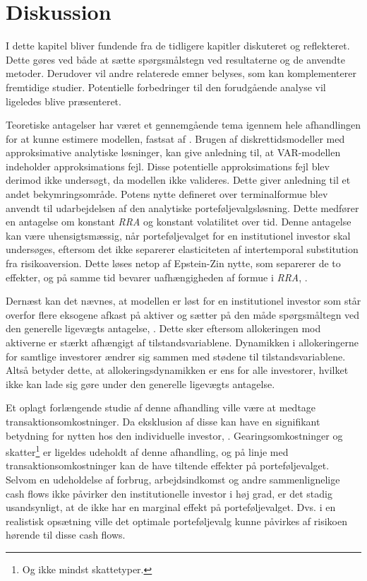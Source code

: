 \documentclass[
  a4paper,
  oneside]{memoir}
\begin{document}
\hypertarget{disku}{%
\chapter{Diskussion}\label{disku}}

I dette kapitel bliver fundende fra de tidligere kapitler diskuteret og reflekteret. Dette gøres ved både at sætte spørgsmålstegn ved resultaterne og de anvendte metoder. Derudover vil andre relaterede emner belyses, som kan komplementerer fremtidige studier. Potentielle forbedringer til den forudgående analyse vil ligeledes blive præsenteret.

Teoretiske antagelser har været et gennemgående tema igennem hele afhandlingen for at kunne estimere modellen, fastsat af \citep{JurVic2011}. Brugen af diskrettidsmodeller med approksimative analytiske løsninger, kan give anledning til, at VAR-modellen indeholder approksimations fejl. Disse potentielle approksimations fejl blev derimod ikke undersøgt, da modellen ikke valideres. Dette giver anledning til et andet bekymringsområde. Potens nytte defineret over terminalformue blev anvendt til udarbejdelsen af den analytiske porteføljevalgsløsning. Dette medfører en antagelse om konstant \emph{RRA} og konstant volatilitet over tid. Denne antagelse kan være uhensigtsmæssig, når porteføljevalget for en institutionel investor skal undersøges, eftersom det ikke separerer elasticiteten af intertemporal substitution fra risikoaversion. Dette løses netop af Epstein-Zin nytte, som separerer de to effekter, og på samme tid bevarer uafhængigheden af formue i \emph{RRA}, \citep{CampVicCha2003}.

Dernæst kan det nævnes, at modellen er løst for en institutionel investor som står overfor flere eksogene afkast på aktiver og sætter på den måde spørgsmåltegn ved den generelle ligevægts antagelse, \citep{CampVic2001}. Dette sker eftersom allokeringen mod aktiverne er stærkt afhængigt af tilstandsvariablene. Dynamikken i allokeringerne for samtlige investorer ændrer sig sammen med stødene til tilstandsvariablene. Altså betyder dette, at allokeringsdynamikken er ens for alle investorer, hvilket ikke kan lade sig gøre under den generelle ligevægts antagelse.

Et oplagt forlængende studie af denne afhandling ville være at medtage transaktionsomkostninger. Da eksklusion af disse kan have en signifikant betydning for nytten hos den individuelle investor, \citep{BalLyn1999}. Gearingsomkostninger og skatter\footnote{Og ikke mindst skattetyper.} er ligeldes udeholdt af denne afhandling, og på linje med transaktionsomkostninger kan de have tiltende effekter på porteføljevalget. Selvom en udeholdelse af forbrug, arbejdsindkomst og andre sammenlignelige cash flows ikke påvirker den institutionelle investor i høj grad, er det stadig usandsynligt, at de ikke har en marginal effekt på porteføljevalget. Dvs. i en realistisk opsætning ville det optimale porteføljevalg kunne påvirkes af risikoen hørende til disse cash flows.
\end{document}
